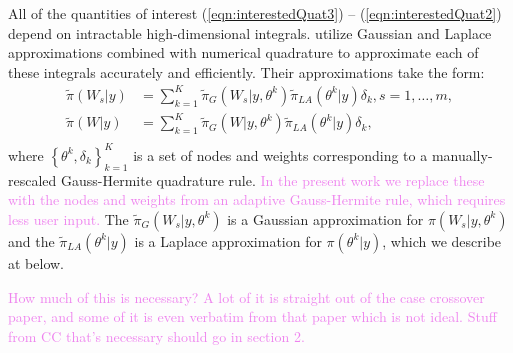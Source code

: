 \documentclass[ba]{imsart}
\newcommand{\alex}[1]{\textcolor{violet}{{ }#1}}
\begin{document}
All of the quantities of interest (\ref{eqn:interestedQuat3}) -- (\ref{eqn:interestedQuat2}) depend on intractable high-dimensional integrals. \cite{casecross} utilize Gaussian and Laplace approximations combined with numerical quadrature to approximate each of these integrals accurately and efficiently. Their approximations take the form:
\begin{equation}\begin{aligned}\label{eqn:integration}
\tilde{\pi}(W_{s}|y) &= \sum_{k=1}^{K}
\tilde{\pi}_{G}(W_{s}|y,\theta^{k})
\tilde{\pi}_{LA}(\theta^{k}|y)\delta_{k}, s = 1,\ldots,m , \\
\tilde{\pi}(W|y) &= \sum_{k=1}^{K}
\tilde{\pi}_{G}(W|y,\theta^{k})
\tilde{\pi}_{LA}(\theta^{k}|y)\delta_{k} , \\
\end{aligned}\end{equation}
where $\left\{\theta^{k},\delta_{k}\right\}_{k=1}^{K}$ is a set of nodes and weights corresponding to a manually-rescaled Gauss-Hermite quadrature rule.\alex{In the present work we replace these with the nodes and weights from an adaptive Gauss-Hermite rule, which requires less user input.} The $\tilde{\pi}_{G}(W_{s}|y,\theta^{k})$ is a Gaussian approximation for $\pi(W_{s}|y,\theta^{k})$ and the $\tilde{\pi}_{LA}(\theta^{k}|y)$ is a Laplace approximation for $\pi(\theta^{k}|y)$, which we describe at below.

\alex{How much of this is necessary? A lot of it is straight out of the case crossover paper, and some of it is even verbatim from that paper which is not ideal. Stuff from CC that's necessary should go in section 2.}
\end{document}
